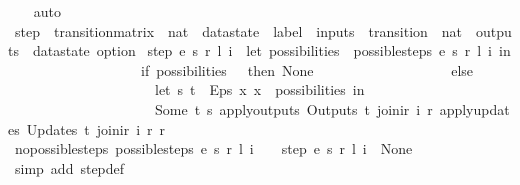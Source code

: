 \begin{isabellebody}
\ \ \isamarkupfalse%
\ auto%
\endisatagproof
{\isafoldproof}%
%
\isadelimproof
\isanewline
%
\endisadelimproof
\isanewline
{}\isamarkupfalse%
\ step\ {\isacharcolon}{\isacharcolon}\ {\isachardoublequoteopen}transition{\isacharunderscore}matrix\ {\isasymRightarrow}\ nat\ {\isasymRightarrow}\ datastate\ {\isasymRightarrow}\ label\ {\isasymRightarrow}\ inputs\ {\isasymRightarrow}\ {\isacharparenleft}transition\ {\isasymtimes}\ nat\ {\isasymtimes}\ outputs\ {\isasymtimes}\ datastate{\isacharparenright}\ option{\isachardoublequoteclose}\ \isanewline
{\isachardoublequoteopen}step\ e\ s\ r\ l\ i\ {\isacharequal}\ {\isacharparenleft}let\ possibilities\ {\isacharequal}\ possible{\isacharunderscore}steps\ e\ s\ r\ l\ i\ in\isanewline
\ \ \ \ \ \ \ \ \ \ \ \ \ \ \ \ \ \ \ if\ possibilities\ {\isacharequal}\ {\isacharbraceleft}{\isacharbar}{\isacharbar}{\isacharbraceright}\ then\ None\isanewline
\ \ \ \ \ \ \ \ \ \ \ \ \ \ \ \ \ \ \ else\isanewline
\ \ \ \ \ \ \ \ \ \ \ \ \ \ \ \ \ \ \ \ \ let\ {\isacharparenleft}s{\isacharprime}{\isacharcomma}\ t{\isacharparenright}\ {\isacharequal}\ Eps\ {\isacharparenleft}{\isasymlambda}x{\isachardot}\ x\ {\isacharbar}{\isasymin}{\isacharbar}\ possibilities{\isacharparenright}\ in\isanewline
\ \ \ \ \ \ \ \ \ \ \ \ \ \ \ \ \ \ \ \ \ Some\ {\isacharparenleft}t{\isacharcomma}\ s{\isacharprime}{\isacharcomma}\ {\isacharparenleft}apply{\isacharunderscore}outputs\ {\isacharparenleft}Outputs\ t{\isacharparenright}\ {\isacharparenleft}join{\isacharunderscore}ir\ i\ r{\isacharparenright}{\isacharparenright}{\isacharcomma}\ {\isacharparenleft}apply{\isacharunderscore}updates\ {\isacharparenleft}Updates\ t{\isacharparenright}\ {\isacharparenleft}join{\isacharunderscore}ir\ i\ r{\isacharparenright}\ r{\isacharparenright}{\isacharparenright}\isanewline
\ \ \ \ \ \ \ \ \ \ \ \ \ \ \ \ \ \ {\isacharparenright}{\isachardoublequoteclose}\isanewline
\isanewline
{}\isamarkupfalse%
\ no{\isacharunderscore}possible{\isacharunderscore}steps{\isacharcolon}\ {\isachardoublequoteopen}possible{\isacharunderscore}steps\ e\ s\ r\ l\ i\ {\isacharequal}\ {\isacharbraceleft}{\isacharbar}{\isacharbar}{\isacharbraceright}\ {\isasymLongrightarrow}\ step\ e\ s\ r\ l\ i\ {\isacharequal}\ None{\isachardoublequoteclose}\isanewline
%
\isadelimproof
\ \ %
\endisadelimproof
%
\isatagproof
{}\isamarkupfalse%
\ {\isacharparenleft}simp\ add{\isacharcolon}\ step{\isacharunderscore}def{\isacharparenright}%
\endisatagproof
{\isafoldproof}%
%
\isadelimproof
\isanewline
%
\endisadelimproof
\isanewline

\end{isabellebody}
